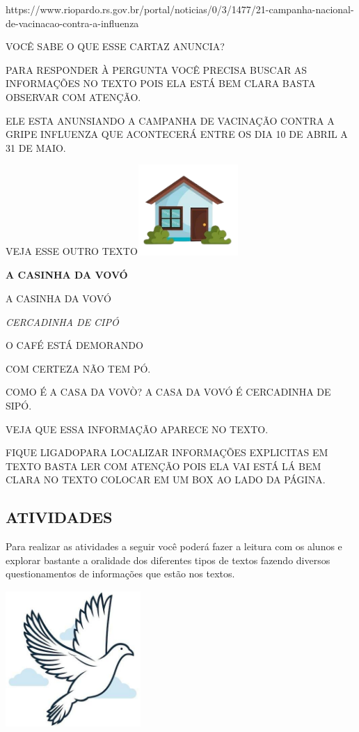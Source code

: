 \begin{escola}
https://www.riopardo.rs.gov.br/portal/noticias/0/3/1477/21-campanha-nacional-de-vacinacao-contra-a-influenza

VOCÊ SABE O QUE ESSE CARTAZ ANUNCIA?

PARA RESPONDER À PERGUNTA VOCÊ PRECISA BUSCAR AS INFORMAÇÕES NO TEXTO
POIS ELA ESTÁ BEM CLARA BASTA OBSERVAR COM ATENÇÃO.

ELE ESTA ANUNSIANDO A CAMPANHA DE VACINAÇÃO CONTRA A GRIPE INFLUENZA QUE
ACONTECERÁ ENTRE OS DIA 10 DE ABRIL A 31 DE MAIO.

VEJA ESSE OUTRO
TEXTO\includegraphics[width=1.50833in,height=1.35903in]{media/image125.jpg}

\textbf{A CASINHA DA VOVÓ}

A CASINHA DA VOVÓ

\emph{CERCADINHA DE CIPÓ}

O CAFÉ ESTÁ DEMORANDO

COM CERTEZA NÃO TEM PÓ.

COMO É A CASA DA VOVÒ? A CASA DA VOVÓ É CERCADINHA DE SIPÓ.

VEJA QUE ESSA INFORMAÇÃO APARECE NO TEXTO.

FIQUE LIGADOPARA LOCALIZAR INFORMAÇÕES EXPLICITAS EM TEXTO BASTA LER COM
ATENÇÃO POIS ELA VAI ESTÁ LÁ BEM CLARA NO TEXTO COLOCAR EM UM BOX AO
LADO DA PÁGINA.

\subsection{ATIVIDADES}\label{atividades-2}

Para realizar as atividades a seguir você poderá fazer a leitura com os
alunos e explorar bastante a oralidade dos diferentes tipos de textos
fazendo diversos questionamentos de informações que estão nos textos.

\includegraphics[width=2.02153in,height=2.05208in]{media/image126.jpg}


\end{escola}
